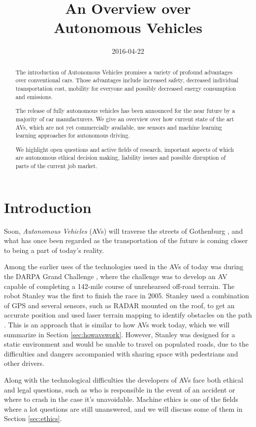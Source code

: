 \documentclass[11pt]{article}
\title{An Overview over \\ Autonomous Vehicles}
\date{2016-04-22}
\begin{document}
\maketitle
\begin{abstract}
The introduction of Autonomous Vehicles promises a variety of profound advantages over conventional cars. Those advantages include increased safety, decreased individual transportation cost, mobility for everyone and possibly decreased energy consumption and emissions. 

The release of fully autonomous vehicles has been announced for the near future by a majority of car manufacturers. We give an overview over how current state of the art AVs, which are not yet commercially available, use sensors and machine learning learning approaches for autonomous driving.

We highlight open questions and active fields of research, important aspects of which are autonomous ethical decision making, liability issues and possible disruption of parts of the current job market.
\end{abstract}

\section{Introduction}
Soon, \textit{Autonomous Vehicles} (AVs) will traverse the streets of Gothenburg \cite{Tornros2015}, and what has once been regarded as the transportation of the future is coming closer to being a part of today's reality. 

Among the earlier uses of the technologies used in the AVs of today was during the DARPA Grand Challenge , where the challenge was to develop an AV capable of completing a 142-mile course of unrehearsed off-road terrain. The robot Stanley was the first to finish the race in 2005. Stanley used a combination of GPS and several sensors, such as RADAR mounted on the roof, to get an accurate position and used laser terrain mapping to identify obstacles on the path \cite{Thrun2006stanley}. This is an approach that is similar to how AVs work today, which we will summarize in Section \ref{sec:howavswork}. However, Stanley was designed for a static environment and would be unable to travel on populated roads, due to the difficulties and dangers accompanied with sharing space with pedestrians and other drivers.

Along with the technological difficulties the developers of AVs face both ethical and legal questions, such as who is responsible in the event of an accident or where to crash in the case it's unavoidable. Machine ethics is one of the fields where a lot questions are still unanswered, and we will discuss some of them in Section \ref{sec:ethics}.
\end{document}
